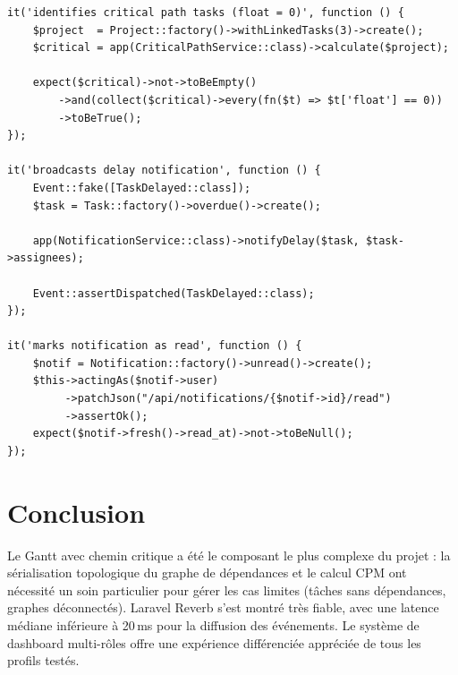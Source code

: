 \begin{lstlisting}[style=phpstyle,caption={Tests unitaires — CPM et notifications},label={lst:tests_s4}]
it('identifies critical path tasks (float = 0)', function () {
    $project  = Project::factory()->withLinkedTasks(3)->create();
    $critical = app(CriticalPathService::class)->calculate($project);

    expect($critical)->not->toBeEmpty()
        ->and(collect($critical)->every(fn($t) => $t['float'] == 0))
        ->toBeTrue();
});

it('broadcasts delay notification', function () {
    Event::fake([TaskDelayed::class]);
    $task = Task::factory()->overdue()->create();

    app(NotificationService::class)->notifyDelay($task, $task->assignees);

    Event::assertDispatched(TaskDelayed::class);
});

it('marks notification as read', function () {
    $notif = Notification::factory()->unread()->create();
    $this->actingAs($notif->user)
         ->patchJson("/api/notifications/{$notif->id}/read")
         ->assertOk();
    expect($notif->fresh()->read_at)->not->toBeNull();
});
\end{lstlisting}

\section*{Conclusion}
Le Gantt avec chemin critique a été le composant le plus complexe du projet : la
sérialisation topologique du graphe de dépendances et le calcul CPM ont nécessité
un soin particulier pour gérer les cas limites (tâches sans dépendances, graphes
déconnectés). Laravel Reverb s'est montré très fiable, avec une latence médiane
inférieure à 20\,ms pour la diffusion des événements. Le système de dashboard
multi-rôles offre une expérience différenciée appréciée de tous les profils testés.
